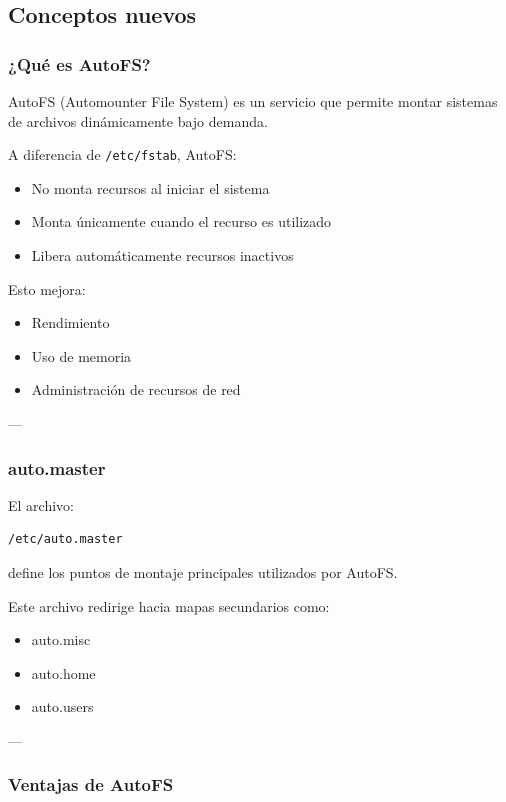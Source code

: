 \documentclass[11pt, letterpaper]{article}
\begin{document}
\subsection{Conceptos nuevos}
\label{sec:org0a11f7e}

\subsubsection{¿Qué es AutoFS?}
\label{sec:org0fbed4a}

AutoFS (Automounter File System) es un servicio que permite montar sistemas de archivos dinámicamente bajo demanda.

A diferencia de \texttt{/etc/fstab}, AutoFS:

\begin{itemize}
\item No monta recursos al iniciar el sistema
\item Monta únicamente cuando el recurso es utilizado
\item Libera automáticamente recursos inactivos
\end{itemize}

Esto mejora:

\begin{itemize}
\item Rendimiento
\item Uso de memoria
\item Administración de recursos de red
\end{itemize}

---
\subsubsection{auto.master}
\label{sec:org14af8a7}

El archivo:

\begin{verbatim}
/etc/auto.master
\end{verbatim}

define los puntos de montaje principales utilizados por AutoFS.

Este archivo redirige hacia mapas secundarios como:

\begin{itemize}
\item auto.misc
\item auto.home
\item auto.users
\end{itemize}

---
\subsubsection{Ventajas de AutoFS}
\label{sec:org26dd011}
\end{document}
